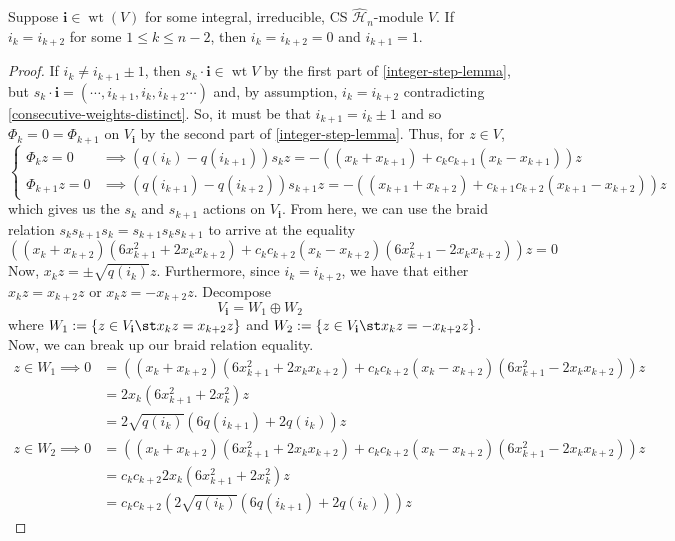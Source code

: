 \documentclass[11pt,leqno,oneside]{amsbook}
\renewcommand{\H}{\mathcal{H}}
\DeclareMathOperator{\wt}{wt}
\renewcommand{\vec}[1]{\mathbf{#1}}
\numberwithin{thm}{section}
\begin{document}
\begin{cor}
  Suppose \(\vec{i} \in \wt(V)\) for some integral, irreducible, CS
  \(\hat{\H}_n\)-module \(V\). If \(i_k = i_{k+2}\) for some \(1 \leq
  k \leq n-2\), then \(i_k = i_{k+2}=0\) and \(i_{k+1}=1\).
\end{cor}
\begin{proof}
  If \(i_k \neq i_{k+1} \pm 1\), then \(s_k \cdot \vec{i} \in \wt V\) by the first part
  of \ref{integer-step-lemma}, but 
  \(s_k \cdot \vec{i} = (\cdots, i_{k+1},i_k,i_{k+2} \cdots)\) and, by
  assumption, \(i_k = i_{k+2}\) contradicting
  \ref{consecutive-weights-distinct}. So, it must be that \(i_{k+1} =
  i_k \pm 1\) and so \(\Phi_k = 0 = \Phi_{k+1}\) on \(V_{\vec{i}}\) by
  the second part of \ref{integer-step-lemma}. Thus, for \(z \in V\), \[
    \begin{cases}
      \Phi_k z = 0 & \implies (q(i_k)-q(i_{k+1}))s_k z =
      -((x_k+x_{k+1})+c_k c_{k+1}(x_k-x_{k+1}))z \\
      \Phi_{k+1} z = 0 & \implies (q(i_{k+1})-q(i_{k+2}))s_{k+1} z =
      -((x_{k+1}+x_{k+2})+c_{k+1} c_{k+2}(x_{k+1}-x_{k+2}))z
    \end{cases}
  \]
  which gives us the \(s_k\) and \(s_{k+1}\) actions on
  \(V_{\vec{i}}\). From here, we can use the braid relation \(s_k
  s_{k+1} s_k = s_{k+1} s_k s_{k+1}\) to arrive
  at the equality \[
    ((x_k+x_{k+2})(6 x_{k+1}^2 + 2 x_k x_{k+2})+c_k c_{k+2}(x_k -
    x_{k+2})(6 x_{k+1}^2 - 2 x_k x_{k+2}))z = 0
  \]
  Now, \(x_k z = \pm \sqrt{q(i_k)} z\). Furthermore, since \(i_k =
  i_{k+2}\), we have that either \(x_k z = x_{k+2} 
  z\) or \(x_k z = -x_{k+2}z\). Decompose \[
    V_{\vec{i}} = W_1 \oplus W_2
  \]
  where \(W_1 := \{z \in V_{\vec{i}} \st x_k z = x_{k+2} z\}\) and
  \(W_2  := \{z \in V_{\vec{i}} \st x_k z = -x_{k+2} z\}\). Now, we
  can break up our braid relation equality.
  \begin{align*}
    z \in W_1 \implies  0
    &= ((x_k+x_{k+2})(6 x_{k+1}^2 + 2 x_k x_{k+2})+c_k c_{k+2}(x_k -
      x_{k+2})(6 x_{k+1}^2 - 2 x_k x_{k+2}))z\\
    & = 2 x_k (6 x_{k+1}^2 + 2 x_k^2) z \\
    & = 2 \sqrt{q(i_k)}(6 q(i_{k+1})+2q(i_k))z \\
    z \in W_2 \implies 0
    &= ((x_k+x_{k+2})(6 x_{k+1}^2 + 2 x_k x_{k+2})+c_k c_{k+2}(x_k -
      x_{k+2})(6 x_{k+1}^2 - 2 x_k x_{k+2}))z\\
    &= c_k c_{k+2}2 x_k (6 x_{k+1}^2+2x_k^2)z\\
    & = c_k c_{k+2}(2 \sqrt{q(i_k)}(6 q(i_{k+1})+2q(i_k)))z

\end{align*}
\end{proof}
\end{document}
